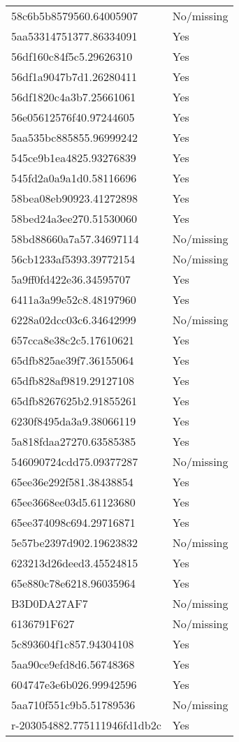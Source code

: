 \begin{tabular}{ll}
58c6b5b8579560.64005907 & No/missing \\
5aa53314751377.86334091 & Yes \\
56df160c84f5c5.29626310 & Yes \\
56df1a9047b7d1.26280411 & Yes \\
56df1820c4a3b7.25661061 & Yes \\
56e05612576f40.97244605 & Yes \\
5aa535bc885855.96999242 & Yes \\
545ce9b1ea4825.93276839 & Yes \\
545fd2a0a9a1d0.58116696 & Yes \\
58bea08eb90923.41272898 & Yes \\
58bed24a3ee270.51530060 & Yes \\
58bd88660a7a57.34697114 & No/missing \\
56cb1233af5393.39772154 & No/missing \\
5a9ff0fd422e36.34595707 & Yes \\
6411a3a99e52c8.48197960 & Yes \\
6228a02dcc03c6.34642999 & No/missing \\
657cca8e38c2c5.17610621 & Yes \\
65dfb825ae39f7.36155064 & Yes \\
65dfb828af9819.29127108 & Yes \\
65dfb8267625b2.91855261 & Yes \\
6230f8495da3a9.38066119 & Yes \\
5a818fdaa27270.63585385 & Yes \\
546090724cdd75.09377287 & No/missing \\
65ee36e292f581.38438854 & Yes \\
65ee3668ee03d5.61123680 & Yes \\
65ee374098c694.29716871 & Yes \\
5e57be2397d902.19623832 & No/missing \\
623213d26deed3.45524815 & Yes \\
65e880c78e6218.96035964 & Yes \\
B3D0DA27AF7 & No/missing \\
6136791F627 & No/missing \\
5c893604f1c857.94304108 & Yes \\
5aa90ce9efd8d6.56748368 & Yes \\
604747e3e6b026.99942596 & Yes \\
5aa710f551c9b5.51789536 & No/missing \\
r-203054882.775111946fd1db2c & Yes \\

\end{tabular}
